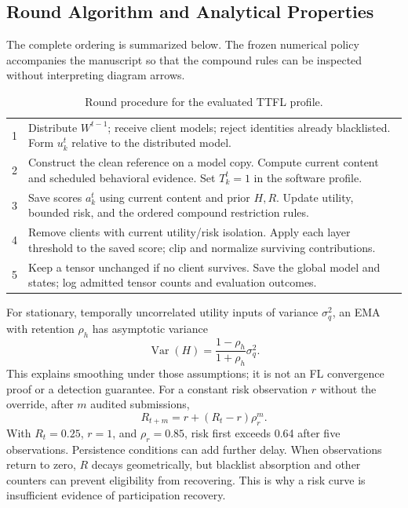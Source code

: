 \documentclass[conference,compsoc]{IEEEtran}
\begin{document}
\subsection{Round Algorithm and Analytical Properties}
The complete ordering is summarized below. The frozen numerical policy accompanies the manuscript so that the compound rules can be inspected without interpreting diagram arrows.
\begin{table}[t]
\caption{Round procedure for the evaluated TTFL profile.}
\label{tab:algorithm}
\centering\footnotesize
\begin{tabular}{@{}p{.3cm}p{7.7cm}@{}}
\toprule
1 & Distribute $W^{t-1}$; receive client models; reject identities already blacklisted. Form $u_k^t$ relative to the distributed model.\\
2 & Construct the clean reference on a model copy. Compute current content and scheduled behavioral evidence. Set $T_k^t=1$ in the software profile.\\
3 & Save scores $a_k^t$ using current content and prior $H,R$. Update utility, bounded risk, and the ordered compound restriction rules.\\
4 & Remove clients with current utility/risk isolation. Apply each layer threshold to the saved score; clip and normalize surviving contributions.\\
5 & Keep a tensor unchanged if no client survives. Save the global model and states; log admitted tensor counts and evaluation outcomes.\\
\bottomrule
\end{tabular}
\end{table}

For stationary, temporally uncorrelated utility inputs of variance $\sigma_q^2$, an EMA with retention $\rho_h$ has asymptotic variance
\begin{equation}
 \operatorname{Var}(H)=\frac{1-\rho_h}{1+\rho_h}\sigma_q^2.
\end{equation}
This explains smoothing under those assumptions; it is not an FL convergence proof or a detection guarantee. For a constant risk observation $r$ without the override, after $m$ audited submissions,
\begin{equation}
 R_{t+m}=r+(R_t-r)\rho_r^m.
\end{equation}
With $R_t=0.25$, $r=1$, and $\rho_r=0.85$, risk first exceeds 0.64 after five observations. Persistence conditions can add further delay. When observations return to zero, $R$ decays geometrically, but blacklist absorption and other counters can prevent eligibility from recovering. This is why a risk curve is insufficient evidence of participation recovery.
\end{document}
